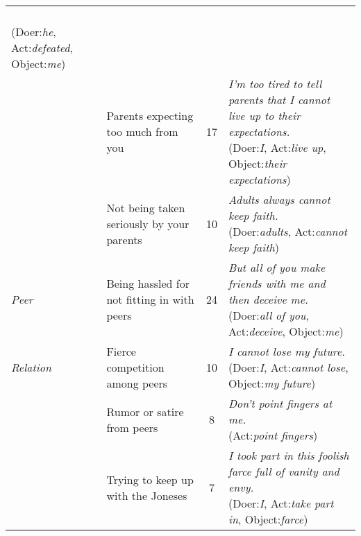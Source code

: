 \begin{table*}
\begin{center}
\begin{footnotesize}
\begin{tabular}{llcl}
{\\(Doer:\emph{he}, Act:\emph{defeated}, Object:\emph{me})}\\ \cline{2-4}
&	Parents expecting too much from you	&	17	&
\tabincell{l}{\emph{I'm too tired to tell parents that I cannot live up to their expectations.}
\\(Doer:\emph{I}, Act:\emph{live up}, Object:\emph{their expectations})}\\ \cline{2-4}
&	Not being taken seriously by your parents	&	10	&
\tabincell{l}{\emph{Adults always cannot keep faith.}
\\(Doer:\emph{adults}, Act:\emph{cannot keep faith})}\\ \hline
\emph{Peer}&	Being hassled for not fitting in with peers	&	24	&
\tabincell{l}{\emph{But all of you make friends with me and then deceive me.}
\\(Doer:\emph{all of you}, Act:\emph{deceive}, Object:\emph{me})}\\ \cline{2-4}
\emph{Relation}&	Fierce competition among peers	&	10	&
\tabincell{l}{\emph{I cannot lose my future.}
\\(Doer:\emph{I}, Act:\emph{cannot lose}, Object:\emph{my future})}\\ \cline{2-4}
&	Rumor or satire from peers	&	8	&
\tabincell{l}{\emph{Don't point fingers at me.}
\\(Act:\emph{point fingers})}\\ \cline{2-4}
&	Trying to keep up with the Joneses	&	7	&
\tabincell{l}{\emph{I took part in this foolish farce full of vanity and envy.}
\\(Doer:\emph{I}, Act:\emph{take part in}, Object:\emph{farce})}\\ \hline
\end{tabular}
\end{footnotesize}
\label{tab:typeOccurNum2}
\end{center}
\end{table*}


